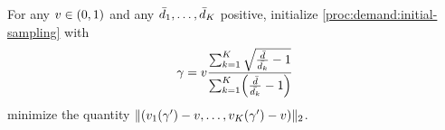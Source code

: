 \begin{prop}\label{prop:demand:generation:gamma-choice}
For any $v\in\bracket{0,1}$ and any $\bar{d}_1,\ldots,\bar{d}_K$ positive, initialize \cref{proc:demand:initial-sampling} with
\begin{equation}
  \gamma
  =
  v\frac
  {\sum_{k=1}^K\sqrt{\frac{\bar{\demand}}{\bar{\demand_k}}-1}}
  {\sum_{k=1}^K\bracket{\frac{\bar{\demand}}{\bar{\demand_k}}-1}}
\end{equation}
minimize the quantity
$\norm{\bracket{v_1(\gamma')-v,\ldots,v_K(\gamma')-v}}_2$.
\end{prop}






